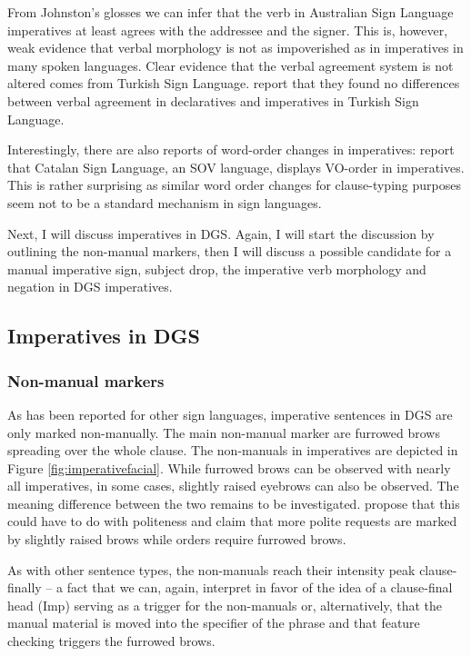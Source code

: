 \noindent From Johnston's glosses we can infer that the verb in Australian Sign Language imperatives at least agrees with the addressee and the signer. This is, however, weak evidence that verbal morphology is not as impoverished as in imperatives in many spoken languages. Clear evidence that the verbal agreement system is not altered comes from Turkish Sign Language. \citet{ozsoy2014commands} report that they found no differences between verbal agreement in declaratives and imperatives in Turkish Sign Language.

Interestingly, there are also reports of word-order changes in imperatives: \citet{donati2017searching} report that Catalan Sign Language, an SOV language, displays VO-order in imperatives. This is rather surprising as similar word order changes for clause-typing purposes seem not to be a standard mechanism in sign languages.

Next, I will discuss imperatives in DGS. Again, I will start the discussion by outlining the non-manual markers, then I will discuss a possible candidate for a manual imperative sign, subject drop, the imperative verb morphology and negation in DGS imperatives.

\subsection{Imperatives in DGS}\label{imperativesindgs}

\subsubsection{Non-manual markers}
As has been reported for other sign languages, imperative sentences in DGS are only marked non-manually. The main non-manual marker are furrowed brows spreading over the whole clause. The non-manuals in imperatives are depicted in Figure \ref{fig:imperativefacial}. While furrowed brows can be observed with nearly all imperatives, in some cases, slightly raised eyebrows can also be observed. The meaning difference between the two remains to be investigated. \citet[342]{happ2014vork} propose that this could have to do with politeness and claim that more polite requests are marked by slightly raised brows while orders require furrowed brows.

As with other sentence types, the non-manuals reach their intensity peak clause-finally -- a fact that we can, again, interpret in favor of the idea of a clause-final head (Imp\textdegree ) serving as a trigger for the non-manuals or, alternatively, that the manual material is moved into the specifier of the phrase and that feature checking triggers the furrowed brows.

